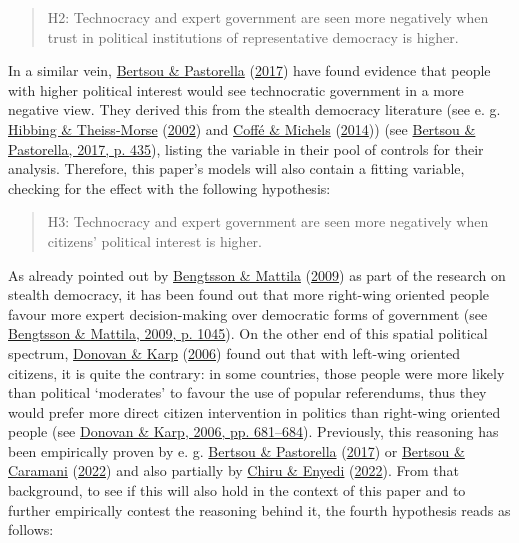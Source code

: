 \documentclass[
  12pt,
  english,
]{article}
\begin{document}
\begin{quote}
H2: Technocracy and expert government are seen more negatively when
trust in political institutions of representative democracy is higher.
\end{quote}

In a similar vein,
\protect\hyperlink{ref-bertsou2017technocratic}{Bertsou \& Pastorella}
(\protect\hyperlink{ref-bertsou2017technocratic}{2017}) have found
evidence that people with higher political interest would see
technocratic government in a more negative view. They derived this from
the stealth democracy literature (see e. g.
\protect\hyperlink{ref-hibbing2002stealth}{Hibbing \& Theiss-Morse}
(\protect\hyperlink{ref-hibbing2002stealth}{2002}) and
\protect\hyperlink{ref-coffe2014education}{Coffé \& Michels}
(\protect\hyperlink{ref-coffe2014education}{2014})) (see
\protect\hyperlink{ref-bertsou2017technocratic}{Bertsou \& Pastorella,
2017, p. 435}), listing the variable in their pool of controls for their
analysis. Therefore, this paper's models will also contain a fitting
variable, checking for the effect with the following hypothesis:

\begin{quote}
H3: Technocracy and expert government are seen more negatively when
citizens' political interest is higher.
\end{quote}

As already pointed out by
\protect\hyperlink{ref-bengtsson2009direct}{Bengtsson \& Mattila}
(\protect\hyperlink{ref-bengtsson2009direct}{2009}) as part of the
research on stealth democracy, it has been found out that more
right-wing oriented people favour more expert decision-making over
democratic forms of government (see
\protect\hyperlink{ref-bengtsson2009direct}{Bengtsson \& Mattila, 2009,
p. 1045}). On the other end of this spatial political spectrum,
\protect\hyperlink{ref-donovan2006popular}{Donovan \& Karp}
(\protect\hyperlink{ref-donovan2006popular}{2006}) found out that with
left-wing oriented citizens, it is quite the contrary: in some
countries, those people were more likely than political `moderates' to
favour the use of popular referendums, thus they would prefer more
direct citizen intervention in politics than right-wing oriented people
(see \protect\hyperlink{ref-donovan2006popular}{Donovan \& Karp, 2006,
pp. 681--684}). Previously, this reasoning has been empirically proven
by e. g. \protect\hyperlink{ref-bertsou2017technocratic}{Bertsou \&
Pastorella} (\protect\hyperlink{ref-bertsou2017technocratic}{2017}) or
\protect\hyperlink{ref-bertsou2022people}{Bertsou \& Caramani}
(\protect\hyperlink{ref-bertsou2022people}{2022}) and also partially by
\protect\hyperlink{ref-chiru2022wants}{Chiru \& Enyedi}
(\protect\hyperlink{ref-chiru2022wants}{2022}). From that background, to
see if this will also hold in the context of this paper and to further
empirically contest the reasoning behind it, the fourth hypothesis reads
as follows:
\end{document}
